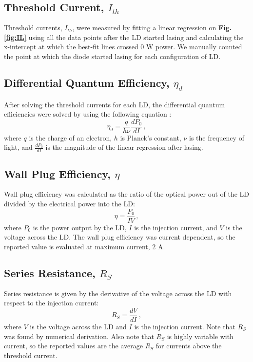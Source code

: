 \documentclass[9pt,twocolumn,twoside]{osajnl}
\begin{document}
\subsection*{Threshold Current, $I_{th}$}
\indent \indent Threshold currents, $I_{th}$, were measured by fitting a linear regression on \textbf{Fig. \ref{fig:IL}} using all the data points after the LD started lasing and calculating the x-intercept at which the best-fit lines crossed 0 W power. We manually counted the point at which the diode started lasing for each configuration of LD. 

\subsection*{Differential Quantum Efficiency, $\eta_d$}
\indent \indent After solving the threshold currents for each LD, the differential quantum efficiencies were solved by using the following equation \cite{Coldren}:
\begin{equation}
    \eta_d=\frac{q}{h\nu}\frac{dP_{0}}{dI} \,,
\end{equation}
where $q$ is the charge of an electron, $h$ is Planck's constant, $\nu$ is the frequency of light, and $\frac{dP_0}{dI}$ is the magnitude of the linear regression after lasing.

\subsection*{Wall Plug Efficiency, $\eta$}
\indent \indent Wall plug efficiency was calculated as the ratio of the optical power out of the LD divided by the electrical power into the LD:
\begin{equation}
    \eta = \frac{P_0}{I V} \,,
\end{equation}
where $P_0$ is the power output by the LD, $I$ is the injection current, and $V$ is the voltage across the LD. The wall plug efficiency was current dependent, so the reported value is evaluated at maximum current, 2 A.

\subsection*{Series Resistance, $R_S$}
\indent \indent Series resistance is given by the derivative of the voltage across the LD with respect to the injection current:
\begin{equation}
    R_S = \frac{dV}{dI} \,,
\end{equation}
where $V$ is the voltage across the LD and $I$ is the injection current. Note that $R_S$ was found by numerical derivation. Also note that $R_S$ is highly variable with current, so the reported values are the average $R_S$ for currents above the threshold current.
\end{document}
